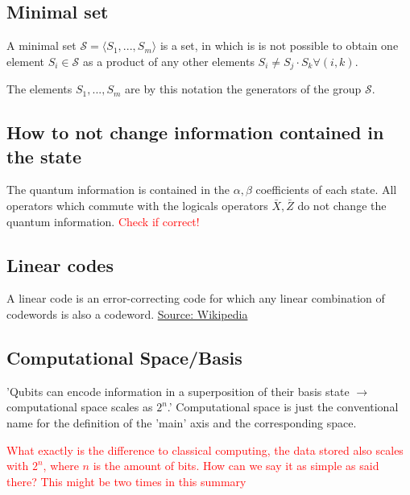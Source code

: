 \subsection{Minimal set}\label{sec:basic.math.minimal_set}

A minimal set $\mathcal{S}= \langle S_1,...,S_m\rangle$ is a set, 
in which is is not possible to obtain one element $S_i \in \mathcal{S}$ 
as a product of any other elements  $S_i \ne S_j \cdot S_k \forall (i,k)$. \cite{QECintro}

The elements $S_1, ..., S_m$ are by this notation the generators of the group $\mathcal{S}$.



\subsection{How to not change information contained in the state}
The quantum information is contained in the $\alpha,\beta$ coefficients of each state.
All operators which commute with the logicals operators $\bar{X},\bar{Z}$ do not change the quantum information. \cite{QECmemory}
\textcolor{red}{Check if correct!}


\subsection{Linear codes}\label{sec:basic.math.linear_codes}
A linear code is an error-correcting code for which any linear combination of codewords is also a codeword. \href{https://en.wikipedia.org/wiki/Linear_code}{Source: Wikipedia} 

\subsection{Computational Space/Basis}
'Qubits can encode information in a superposition of their basis state $\rightarrow$ computational space scales as $2^n$.' \cite{QECintro}
Computational space is just the conventional name for the definition of the 'main' axis and the corresponding space.

\textcolor{red}{What exactly is the difference to classical computing, the data stored also scales with $2^n$, where $n$ is the amount of bits.
How can we say it as simple as said there?
This might be two times in this summary
}